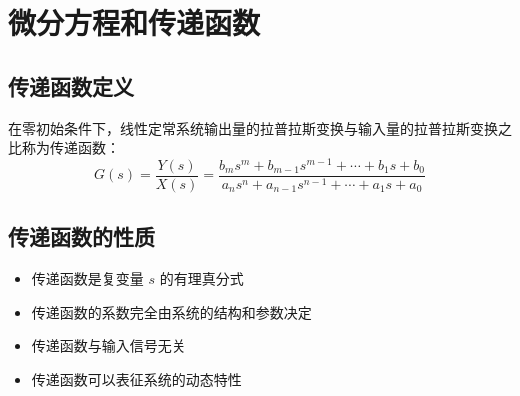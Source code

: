 \section{微分方程和传递函数}

\subsection{传递函数定义}
在零初始条件下，线性定常系统输出量的拉普拉斯变换与输入量的拉普拉斯变换之比称为传递函数：
\[G(s) = \frac{Y(s)}{X(s)} = \frac{b_m s^m + b_{m-1}s^{m-1} + \cdots + b_1 s + b_0}{a_n s^n + a_{n-1}s^{n-1} + \cdots + a_1 s + a_0}\]

\subsection{传递函数的性质}
\begin{itemize}
    \item 传递函数是复变量 $s$ 的有理真分式
    \item 传递函数的系数完全由系统的结构和参数决定
    \item 传递函数与输入信号无关
    \item 传递函数可以表征系统的动态特性
\end{itemize}
